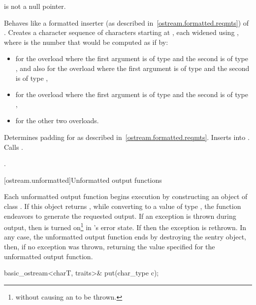 \begin{itemdescr}
\pnum
\expects
{} is not a null pointer.

\pnum
\effects
Behaves like a formatted inserter (as described in~\ref{ostream.formatted.reqmts}) of .
Creates a character sequence  of  characters
starting at , each widened using
,
where  is the number that would be computed as if by:
\begin{itemize}
\item
{}
for the overload where the first argument is of type
and the second is of type
,
and also for the overload where the first argument is of type
and the second is of type
,
\item
{}
for the overload where the first argument is of type
and the second is of type
,
\item
{}
for the other two overloads.
\end{itemize}
Determines padding for  as described
in~\ref{ostream.formatted.reqmts}. Inserts  into
. Calls .

\pnum
\returns
{}.
\end{itemdescr}

[ostream.unformatted]{Unformatted output functions}

\pnum
Each
unformatted
output function begins execution by constructing an object of class
.
If this object returns
,
while converting to a value of type
,
the function endeavors
to generate the requested output.
If an exception is thrown during output, then
is turned on\footnote{without causing an
to be thrown.}
in
's
error state.
If
then the exception is rethrown.
In any case, the unformatted output function ends by destroying the
sentry object, then, if no exception was thrown, returning the value
specified for the unformatted output function.

%
\begin{itemdecl}
basic_ostream<charT, traits>& put(char_type c);
\end{itemdecl}

